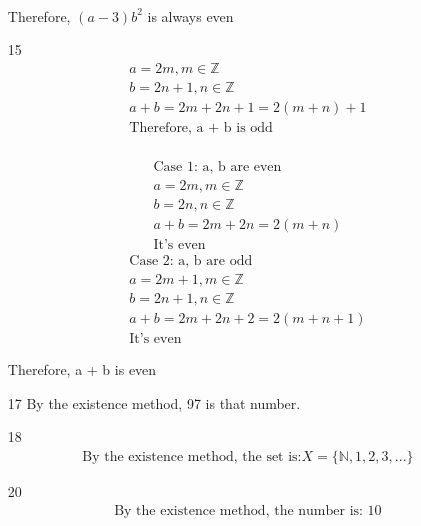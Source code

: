 \documentclass[12pt]{article}
\begin{document}
\begin{enumerate}
\begin{multicols}{2}
\begin{equation*}
\begin{split}
			\end{split}
		\end{equation*}
	    \end{multicols}
	    Therefore, $(a-3)b^2$ is always even
	\item [15] 
	    \begin{equation*}
	    	\begin{split}
		    a = 2m, m \in \mathbb{Z}\\
		    b = 2n + 1, n \in \mathbb{Z}\\
		    a + b = 2m + 2n + 1 = 2(m + n ) + 1\\
		    \text{Therefore, a + b is odd}\\
	    	\end{split}
	    \end{equation*}
	    \begin{multicols}{2}
		\begin{equation*}
			\begin{split}
			    \text{Case 1: a, b are even}\\
			    a = 2m, m \in \mathbb{Z}\\
			    b = 2n, n \in \mathbb{Z}\\
			    a + b = 2m + 2n = 2(m + n)\\
			    \text{It's even}
			\end{split}
		\end{equation*}
		\begin{equation*}
			\begin{split}
			    \text{Case 2: a, b are odd}\\
			    a = 2m + 1, m \in \mathbb{Z}\\
			    b = 2n + 1, n \in \mathbb{Z}\\
			    a + b = 2m + 2n + 2 = 2(m + n + 1)\\
			    \text{It's even}
			\end{split}
		\end{equation*}
	    \end{multicols}
	    Therefore, a + b is even
	\item [17] By the existence method, 97 is that number.
	\item [18] 
	    \begin{equation*}
	    	\begin{split}
		    \text{By the existence method, the set is:} X = \{\mathbb{N}, 1,2,3,...\}
	    	\end{split}
	    \end{equation*}
	\item [20] 
	    \begin{equation*}
	    	\begin{split}
		    \text{By the existence method, the number is: 10}
	    	\end{split}
	    \end{equation*}
\end{enumerate}
\end{document}
